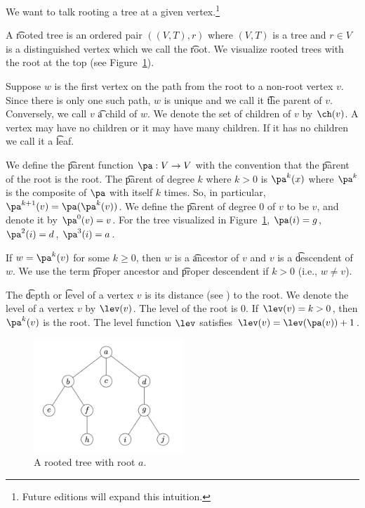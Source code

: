 

We want to talk rooting a tree at a given vertex.\footnote{Future editions will expand this intuition.}


A \t{rooted tree} is an ordered pair $((V, T), r)$ where $(V, T)$ is a tree and $r \in V$ is a distinguished vertex which we call the \t{root}.
We visualize rooted trees with the root at the top (see Figure~\ref{figure:rooted_trees:rooted_tree}).


Suppose $w$ is the first vertex on the path from the root to a non-root vertex $v$.
Since there is only one such path, $w$ is unique and we call it \t{the parent} of $v$.
Conversely, we call $v$ \t{a child} of $w$.
We denote the set of children of $v$ by $\ch(v)$.
A vertex may have no children or it may have many children.
If it has no children we call it a \t{leaf}.

We define the \t{parent function} $\pa: V \to V$ with the convention that the \t{parent of the root} is the root.
The \t{parent of degree $k$} where $k > 0$ is $\pa^k(x)$ where $\pa^k$ is the composite of $\pa$ with itself $k$ times.
So, in particular, $\pa^{k+1}(v) = \pa(\pa^k(v))$.
We define the \t{parent of degree $0$} of $v$ to be $v$, and denote it by $\pa^0(v) = v$.
For the tree visualized in Figure~\ref{figure:rooted_trees:rooted_tree}, $\pa(i) = g$, $\pa^2(i) = d$, $\pa^3(i) = a$.

If $w = \pa^k(v)$ for some $k \geq 0$, then $w$ is a \t{ancestor} of $v$ and $v$ is a \t{descendent} of $w$.
We use the term \t{proper ancestor} and \t{proper descendent} if $k > 0$ (i.e., $w \neq v$).

The \t{depth} or \t{level} of a vertex $v$ is its distance (see ) to the root.
We denote the level of a vertex $v$ by $\lev(v)$.
The level of the root is $0$.
If $\lev(v) = k > 0$, then $\pa^{k}(v)$ is the root.
The level function $\lev$ satisfies $\lev(v) = \lev(\pa(v)) + 1$.

\begin{figure}
  \centering
  \includegraphics[width=0.5\textwidth]{graphics_included/rooted_tree}
  \caption{A rooted tree with root $a$.}
  \label{figure:rooted_trees:rooted_tree}
\end{figure}
